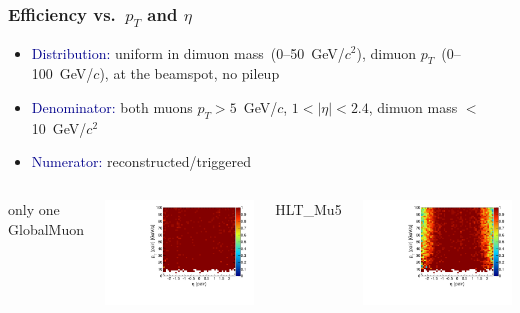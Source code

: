 \documentclass[compress]{beamer}
\begin{document}
\begin{frame}
\frametitle{Efficiency vs.\ $p_T$ and $\eta$}
\begin{itemize}
\item \textcolor{darkblue}{Distribution:} uniform in dimuon mass~(0--50~GeV/$c^2$), dimuon $p_T$~(0--100~GeV/$c$), at the beamspot, no pileup

\item \textcolor{darkblue}{Denominator:} both muons $p_T > 5$~GeV/$c$, $1 < |\eta| < 2.4$, dimuon mass $<$ 10~GeV/$c^2$

\item \textcolor{darkblue}{Numerator:} reconstructed/triggered
\end{itemize}

\vfill
\begin{columns}
\centering only one GlobalMuon

\includegraphics[width=\linewidth]{pteta_mass10cut_oneGlobalMuon.pdf}

\centering HLT\_Mu5

\includegraphics[width=\linewidth]{pteta_mass10cut_Mu5.pdf}


\end{columns}
\end{frame}
\end{document}

